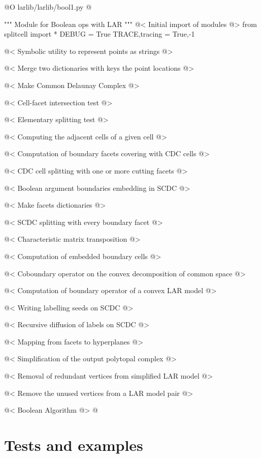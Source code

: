 \documentclass[11pt,oneside]{article}	%
\begin{document}
@O larlib/larlib/bool1.py
@{""" Module for Boolean ops with LAR """
@< Initial import of modules @>
from splitcell import *
DEBUG = True
TRACE,tracing = True,-1

@< Symbolic utility to represent points as strings @>

@< Merge two dictionaries with keys the point locations @>

@< Make Common Delaunay Complex @>

@< Cell-facet intersection test @>

@< Elementary splitting test @>

@< Computing the adjacent cells of a given cell @>

@< Computation of boundary facets covering with CDC cells @>

@< CDC cell splitting with one or more cutting facets @>

@< Boolean argument boundaries embedding in SCDC @>

@< Make facets dictionaries @>

@< SCDC splitting with every boundary facet @>

@< Characteristic matrix transposition @>

@< Computation of embedded boundary cells @>

@< Coboundary operator on the convex decomposition of common space @>

@< Computation of boundary operator of a convex LAR model @>

@< Writing labelling seeds on SCDC @>

@< Recursive diffusion of labels on SCDC @>

@< Mapping from facets to hyperplanes @>

@< Simplification of the output polytopal complex @>

@< Removal of redundant vertices from simplified LAR model @>

@< Remove the unused vertices from a LAR model pair @>

@< Boolean Algorithm @>
@}




\section{Tests and examples}
\end{document}
